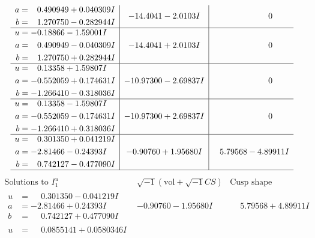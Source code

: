 \documentclass[1p]{elsarticle_modified}
\theoremstyle{definition}
\newcommand{\I}{\sqrt{-1}}
\begin{document}
$$\begin{array}{c|c|c}
\begin{aligned}
a &= \phantom{-}0.490949 + 0.040309 I \\
b &= \phantom{-}1.270750 - 0.282944 I\end{aligned}
 & -14.4041 - 2.0103 I & \phantom{-0.000000 } 0 \\ \hline\begin{aligned}
u &= -0.18866 - 1.59001 I \\
a &= \phantom{-}0.490949 - 0.040309 I \\
b &= \phantom{-}1.270750 + 0.282944 I\end{aligned}
 & -14.4041 + 2.0103 I & \phantom{-0.000000 } 0 \\ \hline\begin{aligned}
u &= \phantom{-}0.13358 + 1.59807 I \\
a &= -0.552059 + 0.174631 I \\
b &= -1.266410 - 0.318036 I\end{aligned}
 & -10.97300 - 2.69837 I & \phantom{-0.000000 } 0 \\ \hline\begin{aligned}
u &= \phantom{-}0.13358 - 1.59807 I \\
a &= -0.552059 - 0.174631 I \\
b &= -1.266410 + 0.318036 I\end{aligned}
 & -10.97300 + 2.69837 I & \phantom{-0.000000 } 0 \\ \hline\begin{aligned}
u &= \phantom{-}0.301350 + 0.041219 I \\
a &= -2.81466 - 0.24393 I \\
b &= \phantom{-}0.742127 - 0.477090 I\end{aligned}
 & -0.90760 + 1.95680 I & \phantom{-}5.79568 - 4.89911 I\\
 \hline 
 \end{array}$$\newpage$$\begin{array}{c|c|c}  
\text{Solutions to }I^u_{1}& \I (\text{vol} + \sqrt{-1}CS) & \text{Cusp shape}\\
 \hline 
\begin{aligned}
u &= \phantom{-}0.301350 - 0.041219 I \\
a &= -2.81466 + 0.24393 I \\
b &= \phantom{-}0.742127 + 0.477090 I\end{aligned}
 & -0.90760 - 1.95680 I & \phantom{-}5.79568 + 4.89911 I \\ \hline\begin{aligned}
u &= \phantom{-}0.0855141 + 0.0580346 I \\

\end{aligned}
\end{array}$$
\end{document}
